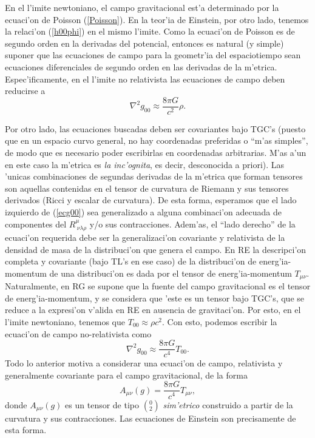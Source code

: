 En el l'imite newtoniano, el campo gravitacional est'a determinado por la
ecuaci'on de Poisson (\ref{Poisson}). En la teor'ia de Einstein, por otro lado,
tenemos la relaci'on (\ref{h00phi}) en el mismo l'imite. Como la ecuaci'on de
Poisson es de segundo orden en la derivadas del potencial, entonces es natural
(y simple) suponer que las ecuaciones de campo para la geometr'ia del
espaciotiempo sean ecuaciones diferenciales de segundo orden en las derivadas de
la m'etrica. Espec'ificamente, en el l'imite no relativista las ecuaciones de campo deben reducirse a
\begin{equation}
 \nabla^2g_{00}\approx\frac{8\pi G}{c^2}\rho . \label{ecg00}
\end{equation}

Por otro lado, las ecuaciones buscadas deben ser covariantes bajo TGC's (puesto
que en un espacio curvo general, no hay coordenadas preferidas o ``m'as
simples'', de modo que es necesario poder escribirlas en coordenadas
arbitrarias. M'as a'un en este caso la m'etrica es \textit{la inc'ognita}, es decir, desconocida a priori). Las 'unicas combinaciones de segundas derivadas de la m'etrica
que forman tensores son aquellas contenidas en el tensor de curvatura de
Riemann y sus tensores derivados (Ricci y escalar de curvatura). De esta forma,
esperamos que el lado izquierdo de (\ref{ecg00}) sea generalizado a alguna
combinaci'on adecuada de componentes del $R^\mu_{\ \nu\lambda\rho}$ y/o sus contracciones.
Adem'as, el ``lado derecho'' de la ecuaci'on requerida debe ser la
generalizaci'on covariante y relativista de la densidad de masa de la
distribuci'on que genera el campo. En RE la descripci'on completa y covariante (bajo TL's en ese caso) de la distribuci'on de energ'ia-momentum de una distribuci'on es dada por el tensor de
energ'ia-momentum $T_{\mu\nu}$. Naturalmente, en RG se supone que la fuente del campo gravitacional es el tensor de energ'ia-momentum, y se considera que 'este es un tensor bajo TGC's, que se reduce a la expresi'on v'alida en RE en ausencia de gravitaci'on. Por esto, en el l'imite newtoniano, tenemos que $T_{00}\approx \rho c^2$. Con esto, podemos escribir la ecuaci'on de campo no-relativista como
\begin{equation}
 \nabla^2g_{00}\approx\frac{8\pi G}{c^4}T_{00} . \label{ecg00T}
\end{equation}
Todo lo anterior motiva a considerar una ecuaci'on de campo, relativista y
generalmente covariante para el campo gravitacional, de la forma
\begin{equation}
A_{\mu\nu}(g)=\frac{8\pi G}{c^4}T_{\mu\nu} , \label{ecgmnT}
\end{equation}
donde $A_{\mu\nu}(g)$ es un tensor de tipo $(^0_2)$ \textit{sim'etrico} construido a partir de la curvatura y sus contracciones. Las ecuaciones de Einstein son precisamente de esta forma.

